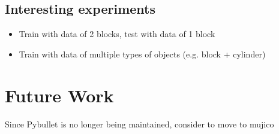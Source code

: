 \documentclass[11pt, a4paper]{report}
\theoremstyle{definition}
\begin{document}
\section{Interesting experiments}
\begin{itemize}
    \item Train with data of 2 blocks, test with data of 1 block
    \item Train with data of multiple types of objects (e.g. block + cylinder)
\end{itemize}



\chapter{Future Work}
\label{chap:6}
Since Pybullet is no longer being maintained, consider to move to mujico



\appendix
\end{document}
